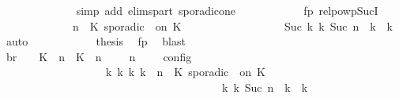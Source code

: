 \begin{isabellebody}
\ \ \ \ \ \ \ \ \ \ \ \ \isamarkupfalse%
\ {\isacharparenleft}simp\ add{\isacharcolon}\ elims{\isacharunderscore}part\ sporadic{\isacharunderscore}on{\isacharunderscore}e{}{\isacharparenright}\isanewline
\ \ \ \ \ \ \ \ \ \ \isamarkupfalse%
\ fp\ relpowp{\isacharunderscore}Suc{\isacharunderscore}I{}\ \isamarkupfalse%
\isanewline
\ \ \ \ \ \ \ \ \ \ \ \ {\isacartoucheopen}{\isacharparenleft}{\isacharparenleft}{\isasymGamma}{\isacharcomma}\ n\ {\isasymturnstile}\ {\isacharparenleft}{\isacharparenleft}K\ sporadic\ {\isasymtau}\ on\ K\ {\isacharhash}\ {\isasymPsi}{\isacharparenright}\ {\isasymtriangleright}\ {\isasymPhi}{\isacharparenright}\isanewline
\ \ \ \ \ \ \ \ \ \ \ \ \ \ {\isasymhookrightarrow}\isactrlbsup Suc\ k\isactrlesup \ {\isacharparenleft}{\isasymGamma}\isactrlsub k{\isacharcomma}\ Suc\ n\ {\isasymturnstile}\ {\isasymPsi}\isactrlsub k\ {\isasymtriangleright}\ {\isasymPhi}\isactrlsub k{\isacharparenright}{\isacharparenright}{\isacartoucheclose}\ \isamarkupfalse%
\ auto\isanewline
\ \ \ \ \ \ \ \ \ \ \isamarkupfalse%
\ {\isacharquery}thesis\ \isamarkupfalse%
\ fp\ \isamarkupfalse%
\ blast\isanewline
\ \ \ \ \ \ \ \ \isamarkupfalse%
\isanewline
\ \ \ \ \ \ \ \ \isamarkupfalse%
\ br{}{\isacharcolon}\ {\isacartoucheopen}{\isasymrho}\ {\isasymin}\ {\isasymlbrakk}\ {\isacharparenleft}{\isacharparenleft}K\ {\isasymUp}\ n{\isacharparenright}\ {\isacharhash}\ {\isacharparenleft}K\ {\isasymDown}\ n\ {\isacharat}\ {\isasymtau}{\isacharparenright}\ {\isacharhash}\ {\isasymGamma}{\isacharparenright}{\isacharcomma}\ n\ {\isasymturnstile}\ {\isasymPsi}\ {\isasymtriangleright}\ {\isasymPhi}\ {\isasymrbrakk}\isactrlsub c\isactrlsub o\isactrlsub n\isactrlsub f\isactrlsub i\isactrlsub g\isanewline
\ \ \ \ \ \ \ \ \ \ \ \ \ \ \ \ \ \ {\isasymLongrightarrow}\ {\isasymexists}{\isasymGamma}\isactrlsub k\ {\isasymPsi}\isactrlsub k\ {\isasymPhi}\isactrlsub k\ k{\isachardot}\ {\isacharparenleft}{\isacharparenleft}{\isasymGamma}{\isacharcomma}\ n\ {\isasymturnstile}\ {\isacharparenleft}{\isacharparenleft}K\ sporadic\ {\isasymtau}\ on\ K\ {\isacharhash}\ {\isasymPsi}{\isacharparenright}\ {\isasymtriangleright}\ {\isasymPhi}{\isacharparenright}\isanewline
\ \ \ \ \ \ \ \ \ \ \ \ \ \ \ \ \ \ \ \ \ \ \ \ \ \ \ \ \ \ \ \ \ \ \ \ \ \ \ \ {\isasymhookrightarrow}\isactrlbsup k\isactrlesup \ {\isacharparenleft}{\isasymGamma}\isactrlsub k{\isacharcomma}\ Suc\ n\ {\isasymturnstile}\ {\isasymPsi}\isactrlsub k\ {\isasymtriangleright}\ {\isasymPhi}\isactrlsub k{\isacharparenright}{\isacharparenright}\isanewline

\end{isabellebody}
